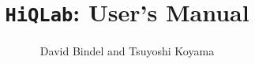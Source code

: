 \documentclass{article}
\newcommand{\hiq}{\texttt{HiQLab}}
\begin{document}
\title{\hiq: User's Manual}
\author{David Bindel and Tsuyoshi Koyama}

\maketitle
\tableofcontents
\newpage












\end{document}
